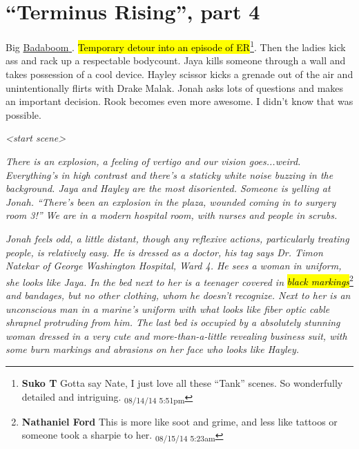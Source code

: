 \setcounter{chapter}{ 29 }
\chapter{\textbf{``Terminus Rising'', part 4} }






Big \underline{  {\color[RGB]{17,85,204}Badaboom}  }.  \hl{Temporary detour into an episode of ER}\footnote{\textbf{Suko T }Gotta say Nate, I just love all these ``Tank'' scenes.  So wonderfully detailed and intriguing. \textsubscript{08/14/14 5:51pm}}.  Then the ladies kick ass and rack up a respectable bodycount.   Jaya kills someone through a wall and takes possession of a cool device.  Hayley scissor kicks a grenade out of the air and unintentionally flirts with Drake Malak.  Jonah asks lots of questions and makes an important decision.  Rook becomes even more awesome.  I didn't know that was possible.







\textit{\textless start scene\textgreater }



\textit{There is an explosion, a feeling of vertigo and our vision goes...weird.  Everything's in high contrast and there's a staticky white noise buzzing in the background.  Jaya and Hayley are the most disoriented.  Someone is yelling at Jonah.  ``There's been an explosion in the plaza, wounded coming in to surgery room 3!''  We are in a modern hospital room, with nurses and people in scrubs.}



\textit{Jonah feels odd, a little distant, though any reflexive actions, particularly treating people, is relatively easy.  He is dressed as a doctor, his tag says Dr. Timon Natekar of George Washington Hospital, Ward 4.  He sees a woman in uniform, she looks like Jaya.  In the bed next to her is a teenager covered in }\textit{\hl{black markings}}\footnote{\textbf{Nathaniel Ford }This is more like soot and grime, and less like tattoos or someone took a sharpie to her. \textsubscript{08/15/14 5:23am}}\textit{ and bandages, but no other clothing, whom he doesn't recognize.  Next to her is an unconscious man in a marine's uniform with what looks like fiber optic cable shrapnel protruding from him.  The last bed is occupied by a absolutely stunning woman dressed in a very cute and more-than-a-little revealing business suit, with some burn markings and abrasions on her face who looks like Hayley.}



